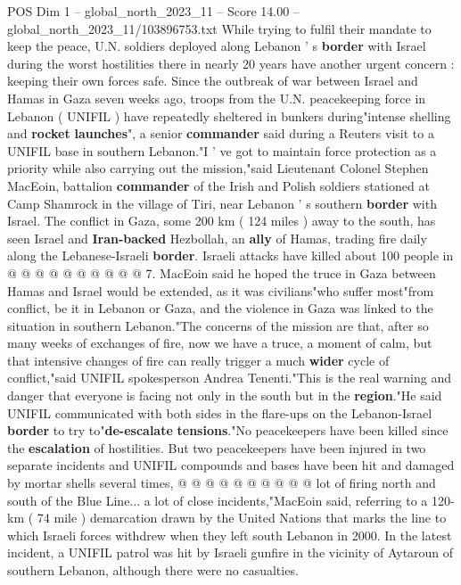 \begin{textsample}{POS Dim 1 – global\_north\_2023\_11 – Score 14.00 – global\_north\_2023\_11/103896753.txt}  \label{ex:f1_pos_357}
While trying to fulfil their mandate to keep the peace, U.N. soldiers deployed along Lebanon ' s \textbf{border} with Israel during the worst hostilities there in nearly 20 years have another urgent concern : keeping their own forces safe.
Since the outbreak of war between Israel and Hamas in Gaza seven weeks ago, troops from the U.N. peacekeeping force in Lebanon ( UNIFIL ) have repeatedly sheltered in bunkers during"intense shelling and \textbf{rocket} \textbf{launches}", a senior \textbf{commander} said during a Reuters visit to a UNIFIL base in southern Lebanon."I ' ve got to maintain force protection as a priority while also carrying out the mission,"said Lieutenant Colonel Stephen MacEoin, battalion \textbf{commander} of the Irish and Polish soldiers stationed at Camp Shamrock in the village of Tiri, near Lebanon ' s southern \textbf{border} with Israel.
The conflict in Gaza, some 200 km ( 124 miles ) away to the south, has seen Israel and \textbf{Iran-backed} Hezbollah, an \textbf{ally} of Hamas, trading fire daily along the Lebanese-Israeli \textbf{border}.
Israeli attacks have killed about 100 people in @ @ @ @ @ @ @ @ @ @ 7.
MacEoin said he hoped the truce in Gaza between Hamas and Israel would be extended, as it was civilians"who suffer most"from conflict, be it in Lebanon or Gaza, and the violence in Gaza was linked to the situation in southern Lebanon."The concerns of the mission are that, after so many weeks of exchanges of fire, now we have a truce, a moment of calm, but that intensive changes of fire can really trigger a much \textbf{wider} cycle of conflict,"said UNIFIL spokesperson Andrea Tenenti."This is the real warning and danger that everyone is facing not only in the south but in the \textbf{region}."He said UNIFIL communicated with both sides in the flare-ups on the Lebanon-Israel \textbf{border} to try to"\textbf{de-escalate} \textbf{tensions}."No peacekeepers have been killed since the \textbf{escalation} of hostilities.
But two peacekeepers have been injured in two separate incidents and UNIFIL compounds and bases have been hit and damaged by mortar shells several times, @ @ @ @ @ @ @ @ @ @ lot of firing north and south of the Blue Line... a lot of close incidents,"MacEoin said, referring to a 120-km ( 74 mile ) demarcation drawn by the United Nations that marks the line to which Israeli forces withdrew when they left south Lebanon in 2000.
In the latest incident, a UNIFIL patrol was hit by Israeli gunfire in the vicinity of Aytaroun of southern Lebanon, although there were no casualties.

\end{textsample}
